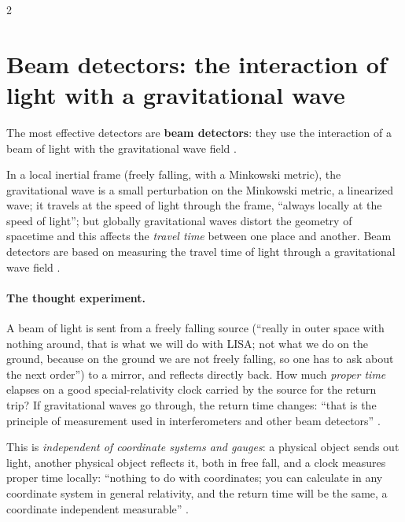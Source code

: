 \begin{paracol}{2}
\section{Beam detectors: the interaction of light with a gravitational wave}\label{sec:c28-beam}

The most effective detectors are \textbf{beam detectors}: they use the interaction of a beam of light with the gravitational wave field .

In a local inertial frame (freely falling, with a Minkowski metric), the gravitational wave is a small perturbation on the Minkowski metric, a linearized wave; it travels at the speed of light through the frame, ``always locally at the speed of light''; but globally gravitational waves distort the geometry of spacetime and this affects the \emph{travel time} between one place and another. Beam detectors are based on measuring the travel time of light through a gravitational wave field .

\paragraph{The thought experiment.} A beam of light is sent from a freely falling source (``really in outer space with nothing around, that is what we will do with LISA; not what we do on the ground, because on the ground we are not freely falling, so one has to ask about the next order'') to a mirror, and reflects directly back. How much \emph{proper time} elapses on a good special-relativity clock carried by the source for the return trip? If gravitational waves go through, the return time changes: ``that is the principle of measurement used in interferometers and other beam detectors'' .

This is \emph{independent of coordinate systems and gauges}: a physical object sends out light, another physical object reflects it, both in free fall, and a clock measures proper time locally: ``nothing to do with coordinates; you can calculate in any coordinate system in general relativity, and the return time will be the same, a coordinate independent measurable'' .


\end{paracol}
